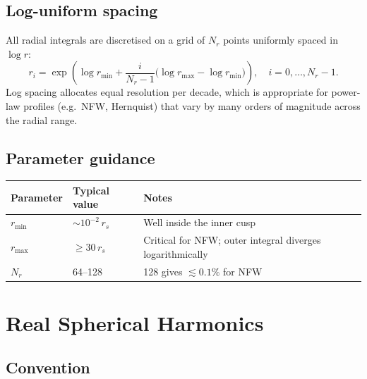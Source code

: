\documentclass[11pt]{article}
\begin{document}
\subsection{Log-uniform spacing}

All radial integrals are discretised on a grid of $N_r$ points uniformly
spaced in $\log r$:
\begin{equation}
  r_i = \exp\!\left(\log r_{\min} + \frac{i}{N_r - 1}
        \bigl(\log r_{\max} - \log r_{\min}\bigr)\right),
  \quad i = 0, \ldots, N_r - 1.
\end{equation}
Log spacing allocates equal resolution per decade, which is appropriate for
power-law profiles (e.g.\ NFW, Hernquist) that vary by many orders of
magnitude across the radial range.

\subsection{Parameter guidance}

\begin{center}
\begin{tabular}{lll}
\toprule
Parameter & Typical value & Notes \\
\midrule
$r_{\min}$ & $\sim 10^{-2}\,r_s$ & Well inside the inner cusp \\
$r_{\max}$ & $\geq 30\,r_s$      & Critical for NFW; outer integral diverges logarithmically \\
$N_r$      & 64--128             & 128 gives $\lesssim 0.1\%$ for NFW \\
\bottomrule
\end{tabular}
\end{center}

\section{Real Spherical Harmonics}

\subsection{Convention}
\end{document}
